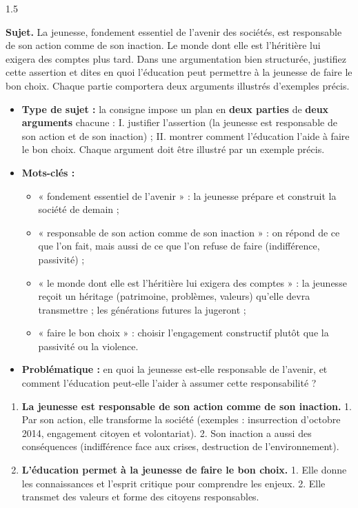 \documentclass[12pt]{article}
\begin{document}
\begin{spacing}{1.5}

\noindent\textbf{Sujet.} La jeunesse, fondement essentiel de l'avenir des sociétés, est responsable de son action comme de son inaction. Le monde dont elle est l'héritière lui exigera des comptes plus tard. Dans une argumentation bien structurée, justifiez cette assertion et dites en quoi l'éducation peut permettre à la jeunesse de faire le bon choix. Chaque partie comportera deux arguments illustrés d'exemples précis.


\begin{itemize}
\item \textbf{Type de sujet :} la consigne impose un plan en \textbf{deux parties} de \textbf{deux arguments} chacune : I. justifier l'assertion (la jeunesse est responsable de son action et de son inaction) ; II. montrer comment l'éducation l'aide à faire le bon choix. Chaque argument doit être illustré par un exemple précis.
\item \textbf{Mots-clés :}
  \begin{itemize}
  \item « fondement essentiel de l'avenir » : la jeunesse prépare et construit la société de demain ;
  \item « responsable de son action comme de son inaction » : on répond de ce que l'on fait, mais aussi de ce que l'on refuse de faire (indifférence, passivité) ;
  \item « le monde dont elle est l'héritière lui exigera des comptes » : la jeunesse reçoit un héritage (patrimoine, problèmes, valeurs) qu'elle devra transmettre ; les générations futures la jugeront ;
  \item « faire le bon choix » : choisir l'engagement constructif plutôt que la passivité ou la violence.
  \end{itemize}
\item \textbf{Problématique :} en quoi la jeunesse est-elle responsable de l'avenir, et comment l'éducation peut-elle l'aider à assumer cette responsabilité ?
\end{itemize}


\begin{enumerate}
\item[I.] \textbf{La jeunesse est responsable de son action comme de son inaction.} 1. Par son action, elle transforme la société (exemples : insurrection d'octobre 2014, engagement citoyen et volontariat). 2. Son inaction a aussi des conséquences (indifférence face aux crises, destruction de l'environnement).
\item[II.] \textbf{L'éducation permet à la jeunesse de faire le bon choix.} 1. Elle donne les connaissances et l'esprit critique pour comprendre les enjeux. 2. Elle transmet des valeurs et forme des citoyens responsables.
\end{enumerate}


\end{spacing}
\end{document}
